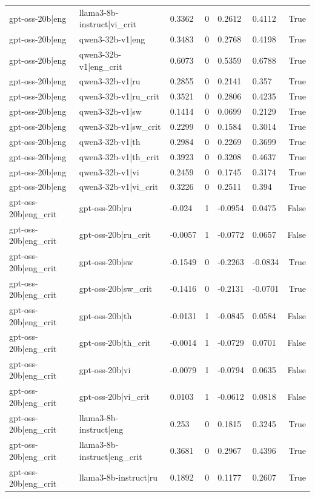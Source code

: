 \begin{table}
\begin{tabular}{llllllr}
gpt-oss-20b|eng & llama3-8b-instruct|vi_crit & 0.3362 & 0 & 0.2612 & 0.4112 & True \\
gpt-oss-20b|eng & qwen3-32b-v1|eng & 0.3483 & 0 & 0.2768 & 0.4198 & True \\
gpt-oss-20b|eng & qwen3-32b-v1|eng_crit & 0.6073 & 0 & 0.5359 & 0.6788 & True \\
gpt-oss-20b|eng & qwen3-32b-v1|ru & 0.2855 & 0 & 0.2141 & 0.357 & True \\
gpt-oss-20b|eng & qwen3-32b-v1|ru_crit & 0.3521 & 0 & 0.2806 & 0.4235 & True \\
gpt-oss-20b|eng & qwen3-32b-v1|sw & 0.1414 & 0 & 0.0699 & 0.2129 & True \\
gpt-oss-20b|eng & qwen3-32b-v1|sw_crit & 0.2299 & 0 & 0.1584 & 0.3014 & True \\
gpt-oss-20b|eng & qwen3-32b-v1|th & 0.2984 & 0 & 0.2269 & 0.3699 & True \\
gpt-oss-20b|eng & qwen3-32b-v1|th_crit & 0.3923 & 0 & 0.3208 & 0.4637 & True \\
gpt-oss-20b|eng & qwen3-32b-v1|vi & 0.2459 & 0 & 0.1745 & 0.3174 & True \\
gpt-oss-20b|eng & qwen3-32b-v1|vi_crit & 0.3226 & 0 & 0.2511 & 0.394 & True \\
gpt-oss-20b|eng_crit & gpt-oss-20b|ru & -0.024 & 1 & -0.0954 & 0.0475 & False \\
gpt-oss-20b|eng_crit & gpt-oss-20b|ru_crit & -0.0057 & 1 & -0.0772 & 0.0657 & False \\
gpt-oss-20b|eng_crit & gpt-oss-20b|sw & -0.1549 & 0 & -0.2263 & -0.0834 & True \\
gpt-oss-20b|eng_crit & gpt-oss-20b|sw_crit & -0.1416 & 0 & -0.2131 & -0.0701 & True \\
gpt-oss-20b|eng_crit & gpt-oss-20b|th & -0.0131 & 1 & -0.0845 & 0.0584 & False \\
gpt-oss-20b|eng_crit & gpt-oss-20b|th_crit & -0.0014 & 1 & -0.0729 & 0.0701 & False \\
gpt-oss-20b|eng_crit & gpt-oss-20b|vi & -0.0079 & 1 & -0.0794 & 0.0635 & False \\
gpt-oss-20b|eng_crit & gpt-oss-20b|vi_crit & 0.0103 & 1 & -0.0612 & 0.0818 & False \\
gpt-oss-20b|eng_crit & llama3-8b-instruct|eng & 0.253 & 0 & 0.1815 & 0.3245 & True \\
gpt-oss-20b|eng_crit & llama3-8b-instruct|eng_crit & 0.3681 & 0 & 0.2967 & 0.4396 & True \\
gpt-oss-20b|eng_crit & llama3-8b-instruct|ru & 0.1892 & 0 & 0.1177 & 0.2607 & True \\

\end{tabular}
\end{table}

